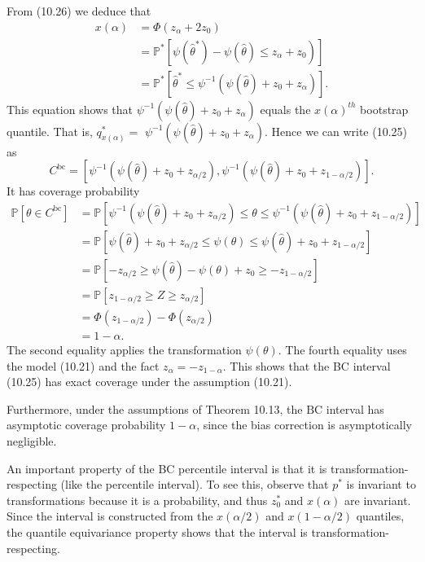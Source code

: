 \documentclass[10pt]{article}
\begin{document}
From (10.26) we deduce that
$$
\begin{aligned}
x(\alpha) &=\Phi\left(z_{\alpha}+2 z_{0}\right) \\
&\left.=\mathbb{P}^{*}\left[\psi\left(\widehat{\theta}^{*}\right)-\psi(\widehat{\theta}) \leq z_{\alpha}+z_{0}\right)\right] \\
&=\mathbb{P}^{*}\left[\widehat{\theta}^{*} \leq \psi^{-1}\left(\psi(\widehat{\theta})+z_{0}+z_{\alpha}\right)\right] .
\end{aligned}
$$
This equation shows that $\psi^{-1}\left(\psi(\widehat{\theta})+z_{0}+z_{\alpha}\right)$ equals the $x(\alpha)^{t h}$ bootstrap quantile. That is, $q_{x(\alpha)}^{*}=$ $\psi^{-1}\left(\psi(\widehat{\theta})+z_{0}+z_{\alpha}\right)$. Hence we can write (10.25) as
$$
C^{\mathrm{bc}}=\left[\psi^{-1}\left(\psi(\widehat{\theta})+z_{0}+z_{\alpha / 2}\right), \psi^{-1}\left(\psi(\widehat{\theta})+z_{0}+z_{1-\alpha / 2}\right)\right] .
$$
It has coverage probability
$$
\begin{aligned}
\mathbb{P}\left[\theta \in C^{\mathrm{bc}}\right] &=\mathbb{P}\left[\psi^{-1}\left(\psi(\widehat{\theta})+z_{0}+z_{\alpha / 2}\right) \leq \theta \leq \psi^{-1}\left(\psi(\widehat{\theta})+z_{0}+z_{1-\alpha / 2}\right)\right] \\
&=\mathbb{P}\left[\psi(\widehat{\theta})+z_{0}+z_{\alpha / 2} \leq \psi(\theta) \leq \psi(\widehat{\theta})+z_{0}+z_{1-\alpha / 2}\right] \\
&=\mathbb{P}\left[-z_{\alpha / 2} \geq \psi(\widehat{\theta})-\psi(\theta)+z_{0} \geq-z_{1-\alpha / 2}\right] \\
&=\mathbb{P}\left[z_{1-\alpha / 2} \geq Z \geq z_{\alpha / 2}\right] \\
&=\Phi\left(z_{1-\alpha / 2}\right)-\Phi\left(z_{\alpha / 2}\right) \\
&=1-\alpha .
\end{aligned}
$$
The second equality applies the transformation $\psi(\theta)$. The fourth equality uses the model (10.21) and the fact $z_{\alpha}=-z_{1-\alpha}$. This shows that the BC interval (10.25) has exact coverage under the assumption (10.21).

Furthermore, under the assumptions of Theorem 10.13, the $\mathrm{BC}$ interval has asymptotic coverage probability $1-\alpha$, since the bias correction is asymptotically negligible.

An important property of the BC percentile interval is that it is transformation-respecting (like the percentile interval). To see this, observe that $p^{*}$ is invariant to transformations because it is a probability, and thus $z_{0}^{*}$ and $x(\alpha)$ are invariant. Since the interval is constructed from the $x(\alpha / 2)$ and $x(1-\alpha / 2)$ quantiles, the quantile equivariance property shows that the interval is transformation-respecting.
\end{document}
